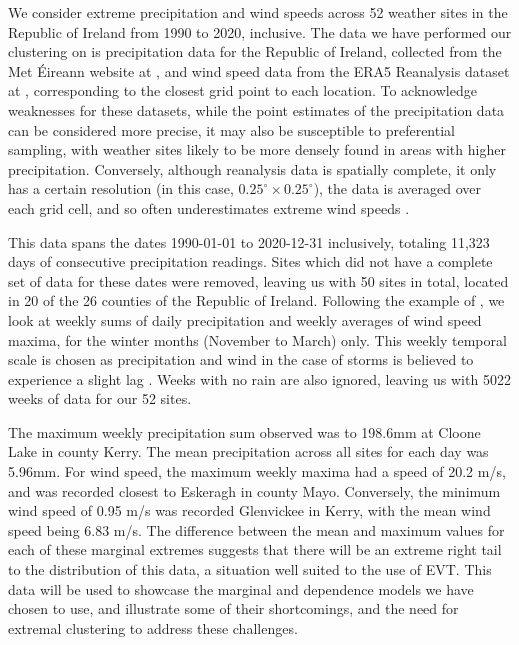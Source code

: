 \documentclass{article}
\numberwithin{equation}{section}
\begin{document}
We consider extreme precipitation and wind speeds across 52 weather sites in the Republic of Ireland from 1990 to 2020, inclusive.  
The data we have performed our clustering on is precipitation data for the Republic of Ireland, collected from the Met Éireann website at \citet{metHistoricalData}, and wind speed data from the ERA5 Reanalysis dataset at \citet{Hersbach2020}, corresponding to the closest grid point to each location.
To acknowledge weaknesses for these datasets, while the point estimates of the precipitation data can be considered more precise, it may also be susceptible to preferential sampling, with weather sites likely to be more densely found in areas with higher precipitation.
Conversely, although reanalysis data is spatially complete, it only has a certain resolution (in this case, $0.25^{\circ} \times 0.25^{\circ}$), the data is averaged over each grid cell, and so often underestimates extreme wind speeds \citep{Gandoin2024}.

This data spans the dates 1990-01-01 to 2020-12-31 inclusively, totaling 11,323 days of consecutive precipitation readings. 
Sites which did not have a complete set of data for these dates were removed, leaving us with 50 sites in total, located in 20 of the 26 counties of the Republic of Ireland. 
Following the example of \citet{Vignotto2021}, we look at weekly sums of daily precipitation and weekly averages of wind speed maxima, for the winter months (November to March) only.
This weekly temporal scale is chosen as precipitation and wind in the case of storms is believed to experience a slight lag \citep{Bengtsson2009}.
Weeks with no rain are also ignored, leaving us with 5022 weeks of data for our 52 sites.

The maximum weekly precipitation sum observed was to 198.6mm at Cloone Lake in county Kerry. 
The mean precipitation across all sites for each day was 5.96mm.
For wind speed, the maximum weekly maxima had a speed of 20.2 m/s, and was recorded closest to Eskeragh in county Mayo.
Conversely, the minimum wind speed of 0.95 m/s was recorded Glenvickee in Kerry, with the mean wind speed being 6.83 m/s.
The difference between the mean and maximum values for each of these marginal extremes suggests that there will be an extreme right tail to the distribution of this data, a situation well suited to the use of EVT.
This data will be used to showcase the marginal and dependence models we have chosen to use, and illustrate some of their shortcomings, and the need for extremal clustering to address these challenges.
\end{document}
